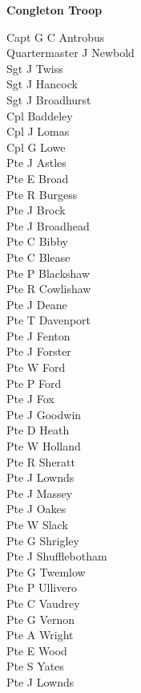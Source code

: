 \begin{center}
  \Large
  \textbf{Congleton Troop}
\end{center}

\begin{multicols}{2}
  \noindent
  Capt G C Antrobus \\
  Quartermaster J Newbold \\
  Sgt J Twiss \\
  Sgt J Hancock \\
  Sgt J Broadhurst \\
  Cpl Baddeley \\
  Cpl J Lomas \\
  Cpl G Lowe \\
  Pte J Astles \\
  Pte E Broad \\
  Pte R Burgess \\
  Pte J Brock \\
  Pte J Broadhead \\
  Pte C Bibby \\
  Pte C Blease \\
  Pte P Blackshaw \\
  Pte R Cowlishaw \\
  Pte J Deane \\
  Pte T Davenport \\
  Pte J Fenton \\
  Pte J Forster \\
  Pte W Ford \\
  Pte P Ford \\
  Pte J Fox \\
  Pte J Goodwin \\
  Pte D Heath \\
  Pte W Holland \\
  Pte R Sheratt \\
  Pte J Lownds \\
  Pte J Massey \\
  Pte J Oakes \\
  Pte W Slack \\
  Pte G Shrigley \\
  Pte J Shufflebotham \\
  Pte G Twemlow \\
  Pte P Ullivero \\
  Pte C Vaudrey \\
  Pte G Vernon \\
  Pte A Wright \\
  Pte E Wood \\
  Pte S Yates \\
  Pte J Lownds \\
\end{multicols}

